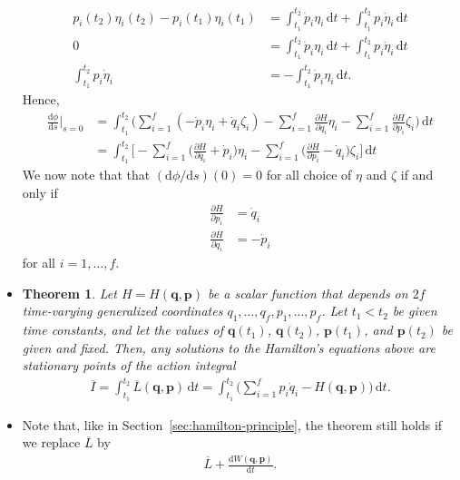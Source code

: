 \documentclass[10pt]{article}
\newtheorem{theorem}[lemma]{Theorem}
\newcommand{\dee}{\mathrm{d}}
\newcommand{\ve}[1]{\mathbf{#1}}
\begin{document}
\begin{itemize}
\begin{align*}
      p_i(t_2)\eta_i(t_2) - p_i(t_1)\eta_i(t_1)
      &= \int_{t_1}^{t_2} \dot{p}_i \eta_i\, \dee t + \int_{t_1}^{t_2} p_i \dot{\eta}_i\, \dee t\\
      0
      &= \int_{t_1}^{t_2} \dot{p}_i \eta_i\, \dee t + \int_{t_1}^{t_2} p_i \dot{\eta}_i\, \dee t \\
      \int_{t_1}^{t_2} p_i \dot{\eta}_i
      &= - \int_{t_1}^{t_2} \dot{p}_i \eta_i\, \dee t.
    \end{align*}
    Hence,
    \begin{align*}
      \frac{\dee \phi}{\dee s}\bigg|_{s=0}
      &= \int_{t_1}^{t_2} \bigg( \sum_{i=1}^f (-\dot{p}_i \eta_i + \dot{q}_i \zeta_i ) - \sum_{i=1}^f \frac{\partial H}{\partial q_i}\eta_i -\sum_{i=1}^f \frac{\partial H}{\partial p_i}\zeta_i \bigg)\, \dee t \\
      &= \int_{t_1}^{t_2} \bigg[ -\sum_{i=1}^f \bigg( \frac{\partial H}{\partial q_i} + \dot{p}_i \bigg) \eta_i - \sum_{i=1}^f \bigg( \frac{\partial H}{\partial p_i} - \dot{q}_i \bigg) \zeta_i \bigg] \, \dee t
    \end{align*}
    We now note that that $(\dee \phi/\dee s)(0) = 0$ for all choice of $\eta$ and $\zeta$ if and only if
    \begin{align*}
      \frac{\partial H}{\partial p_i} &= \dot{q}_i \\
      \frac{\partial H}{\partial q_i} &= -\dot{p}_i
    \end{align*}
    for all $i = 1,\dotsc, f$.

    \item \begin{theorem} Let $H = H(\ve{q}, \ve{p})$ be a scalar function that depends on $2f$ time-varying generalized coordinates $q_1, \dotsc, q_f, p_1, \dotsc, p_f$. Let $t_1 < t_2$ be given time constants, and let the values of $\ve{q}(t_1)$, $\ve{q}(t_2)$, $\ve{p}(t_1)$, and $\ve{p}(t_2)$ be given and fixed. Then, any solutions to the Hamilton's equations above are stationary points of the action integral
    \begin{align*}
      \overline{I} 
      = \int_{t_1}^{t_2} \overline{L}(\ve{q},\ve{p}) \, \dee t 
      = \int_{t_1}^{t_2} \bigg( \sum_{i=1}^f p_i \dot{q}_i - H(\ve{q},\ve{p}) \bigg)\, \dee t.
    \end{align*}
    \end{theorem}

    \item Note that, like in Section~\ref{sec:hamilton-principle}, the theorem still holds if we replace $\overline{L}$ by
    \begin{align*}
      \overline{L} + \frac{\dee W(\ve{q}, \ve{p})}{\dee t}.
    \end{align*}
  \end{itemize}
\end{document}
